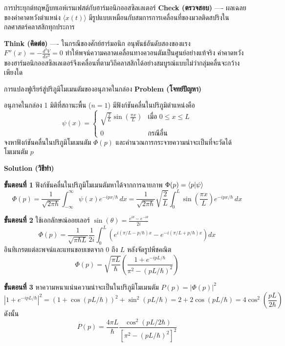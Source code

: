 \begin{psctbox}{การประยุกต์ทฤษฎีบทเอห์เรนเฟสต์กับฮาร์มอนิกออสซิลเลเตอร์}
\textbf{Check (ตรวจสอบ)} ---- ผลเฉลยของค่าคาดหวังตำแหน่ง $\langle x(t) \rangle$ มีรูปแบบเหมือนกับสมการการเคลื่อนที่ของมวลติดสปริงในกลศาสตร์คลาสสิกทุกประการ

\textbf{Think (คิดต่อ)} ---- ในกรณีของศักย์ฮาร์มอนิก อนุพันธ์อันดับสองของแรง $F''(x) = -\frac{d^3 V}{dx^3} = 0$ ทำให้พจน์ความคลาดเคลื่อนทางควอนตัมเป็นศูนย์อย่างแท้จริง ค่าคาดหวังของฮาร์มอนิกออสซิลเลเตอร์จึงเคลื่อนที่ตามวิถีคลาสสิกได้อย่างสมบูรณ์แบบไม่ว่ากลุ่มคลื่นจะกว้างเพียงใด
\end{psctbox}

\begin{psctbox}{การแปลงฟูเรียร์สู่ปริภูมิโมเมนตัมของอนุภาคในกล่อง}
\textbf{Problem (โจทย์ปัญหา)}

อนุภาคในกล่อง 1 มิติที่สถานะพื้น ($n = 1$) มีฟังก์ชันคลื่นในปริภูมิตำแหน่งคือ
\begin{equation*}
\psi(x) = \begin{cases} \sqrt{\frac{2}{L}}\sin\left( \frac{\pi x}{L} \right) & \text{เมื่อ } 0 \le x \le L \\ 0 & \text{กรณีอื่น} \end{cases}
\end{equation*}
จงหาฟังก์ชันคลื่นในปริภูมิโมเมนตัม $\Phi(p)$ และคำนวณการกระจายความน่าจะเป็นที่จะวัดได้โมเมนตัม $p$

\textbf{Solution (วิธีทำ)}

\textbf{ขั้นตอนที่ 1} ฟังก์ชันคลื่นในปริภูมิโมเมนตัมหาได้จากการฉายภาพ $\Phi(p) = \braket{p}{\psi}$
\begin{equation*}
\Phi(p) = \frac{1}{\sqrt{2\pi\hbar}} \int_{-\infty}^{\infty} \psi(x) e^{-ipx/\hbar} \, dx = \frac{1}{\sqrt{2\pi\hbar}} \sqrt{\frac{2}{L}} \int_{0}^{L} \sin\left( \frac{\pi x}{L} \right) e^{-ipx/\hbar} \, dx
\end{equation*}

\textbf{ขั้นตอนที่ 2} ใช้เอกลักษณ์ออยเลอร์ $\sin(\theta) = \frac{e^{i\theta} - e^{-i\theta}}{2i}$
\begin{equation*}
\Phi(p) = \frac{1}{\sqrt{\pi\hbar L}}\frac{1}{2i} \int_{0}^{L} \left( e^{i(\pi/L - p/\hbar)x} - e^{-i(\pi/L + p/\hbar)x} \right) dx
\end{equation*}
อินทิเกรตแต่ละพจน์และแทนขอบเขตจาก $0$ ถึง $L$ หลังจัดรูปพีชคณิต
\begin{equation*}
\Phi(p) = \sqrt{\frac{\pi L}{\hbar}} \left( \frac{1 + e^{-ipL/\hbar}}{\pi^2 - (pL/\hbar)^2} \right)
\end{equation*}

\textbf{ขั้นตอนที่ 3} หาความหนาแน่นความน่าจะเป็นในปริภูมิโมเมนตัม $P(p) = |\Phi(p)|^2$
\begin{equation*}
|1 + e^{-ipL/\hbar}|^2 = (1 + \cos(pL/\hbar))^2 + \sin^2(pL/\hbar) = 2 + 2\cos(pL/\hbar) = 4\cos^2\left( \frac{pL}{2\hbar} \right)
\end{equation*}
ดังนั้น
\begin{equation*}
P(p) = \frac{4\pi L}{\hbar} \frac{\cos^2(pL / 2\hbar)}{\left[ \pi^2 - (pL/\hbar)^2 \right]^2}
\end{equation*}


\end{psctbox}
